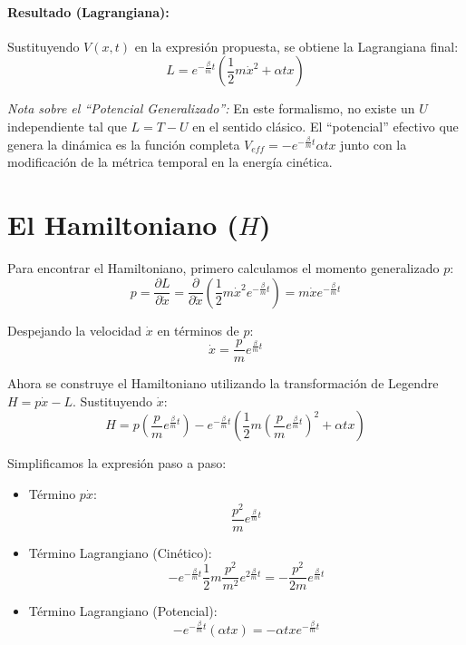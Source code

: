 \documentclass[12pt, a4paper]{article}
\begin{document}
\paragraph{Resultado (Lagrangiana):} Sustituyendo $V(x,t)$ en la expresión propuesta, se obtiene la Lagrangiana final:
\begin{equation}
    L = e^{-\frac{\beta}{m}t} \left( \frac{1}{2}m\dot{x}^2 + \alpha t x \right)
\end{equation}

\textit{Nota sobre el ``Potencial Generalizado'':} En este formalismo, no existe un $U$ independiente tal que $L=T-U$ en el sentido clásico. El ``potencial'' efectivo que genera la dinámica es la función completa $V_{eff} = -e^{-\frac{\beta}{m}t} \alpha t x$ junto con la modificación de la métrica temporal en la energía cinética.

\section*{El Hamiltoniano ($H$)}

Para encontrar el Hamiltoniano, primero calculamos el momento generalizado $p$:
\begin{equation}
    p = \frac{\partial L}{\partial \dot{x}} = \frac{\partial}{\partial \dot{x}} \left( \frac{1}{2}m\dot{x}^2 e^{-\frac{\beta}{m}t} \right) = m\dot{x} e^{-\frac{\beta}{m}t}
\end{equation}

Despejando la velocidad $\dot{x}$ en términos de $p$:
\begin{equation}
    \dot{x} = \frac{p}{m} e^{\frac{\beta}{m}t}
    \label{eq:x_dot_p}
\end{equation}

Ahora se construye el Hamiltoniano utilizando la transformación de Legendre $H = p\dot{x} - L$. Sustituyendo $\dot{x}$:
\begin{equation}
    H = p \left( \frac{p}{m} e^{\frac{\beta}{m}t} \right) - e^{-\frac{\beta}{m}t} \left( \frac{1}{2}m \left( \frac{p}{m} e^{\frac{\beta}{m}t} \right)^2 + \alpha t x \right)
\end{equation}

Simplificamos la expresión paso a paso:
\begin{itemize}
    \item Término $p\dot{x}$:
    \[ \frac{p^2}{m} e^{\frac{\beta}{m}t} \]
    \item Término Lagrangiano (Cinético):
    \[ - e^{-\frac{\beta}{m}t} \frac{1}{2}m \frac{p^2}{m^2} e^{2\frac{\beta}{m}t} = - \frac{p^2}{2m} e^{\frac{\beta}{m}t} \]
    \item Término Lagrangiano (Potencial):
    \[ - e^{-\frac{\beta}{m}t} (\alpha t x) = - \alpha t x e^{-\frac{\beta}{m}t} \]
\end{itemize}
\end{document}
